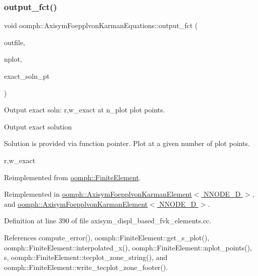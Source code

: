 \subsubsection{\texorpdfstring{output\+\_\+fct()}{output\_fct()}\hspace{0.1cm}{\footnotesize\ttfamily [3/4]}}
{\footnotesize\ttfamily void oomph\+::\+Axisym\+Foepplvon\+Karman\+Equations\+::output\+\_\+fct (\begin{DoxyParamCaption}\item[{std\+::ostream \&}]{outfile,  }\item[{const unsigned \&}]{nplot,  }\item[{\hyperlink{classoomph_1_1FiniteElement_a690fd33af26cc3e84f39bba6d5a85202}{Finite\+Element\+::\+Steady\+Exact\+Solution\+Fct\+Pt}}]{exact\+\_\+soln\+\_\+pt }\end{DoxyParamCaption})\hspace{0.3cm}{\ttfamily [virtual]}}



Output exact soln\+: r,w\+\_\+exact at n\+\_\+plot plot points. 

Output exact solution

Solution is provided via function pointer. Plot at a given number of plot points.

r,w\+\_\+exact 

Reimplemented from \hyperlink{classoomph_1_1FiniteElement_a22b695c714f60ee6cd145be348042035}{oomph\+::\+Finite\+Element}.



Reimplemented in \hyperlink{classoomph_1_1AxisymFoepplvonKarmanElement_aee745c3439aa18c82ddbe8b90fade1c0}{oomph\+::\+Axisym\+Foepplvon\+Karman\+Element$<$ N\+N\+O\+D\+E\+\_\+D $>$}, and \hyperlink{classoomph_1_1AxisymFoepplvonKarmanElement_aee745c3439aa18c82ddbe8b90fade1c0}{oomph\+::\+Axisym\+Foepplvon\+Karman\+Element$<$ N\+N\+O\+D\+E\+\_\+D $>$}.



Definition at line 390 of file axisym\+\_\+displ\+\_\+based\+\_\+fvk\+\_\+elements.\+cc.



References compute\+\_\+error(), oomph\+::\+Finite\+Element\+::get\+\_\+s\+\_\+plot(), oomph\+::\+Finite\+Element\+::interpolated\+\_\+x(), oomph\+::\+Finite\+Element\+::nplot\+\_\+points(), s, oomph\+::\+Finite\+Element\+::tecplot\+\_\+zone\+\_\+string(), and oomph\+::\+Finite\+Element\+::write\+\_\+tecplot\+\_\+zone\+\_\+footer().



